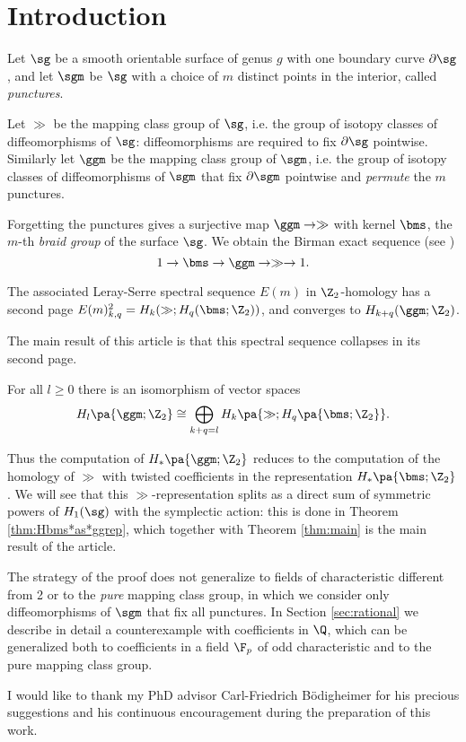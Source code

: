 \section{Introduction}
Let $\sg$ be a smooth orientable surface of genus $g$ with one boundary curve $\partial\sg$, and let $\sgm$ be $\sg$ with
a choice of $m$ distinct points in the interior, called \emph{punctures}.

Let $\gg$ be the mapping class group of $\sg$, i.e. the group of isotopy classes of diffeomorphisms of $\sg$:
diffeomorphisms are required to fix $\partial\sg$ pointwise. Similarly let $\ggm$ be the mapping class group of $\sgm$, i.e.
the group of isotopy classes of diffeomorphisms of $\sgm$ that fix $\partial\sgm$ pointwise and \emph{permute} the $m$ punctures.

Forgetting the punctures gives a surjective map $\ggm\to\gg$ with kernel $\bms$,
the $m$-th \emph{braid group} of the surface $\sg$. We obtain the Birman exact sequence (see \cite{Birman:mcgbr})
\begin{equation}
\label{eq:Birman}
1\to\bms\to\ggm\to\gg\to 1.
\end{equation}

The associated Leray-Serre spectral sequence $E(m)$ in $\Z_2$-homology has a second page $E(m)^2_{k,q}=H_k(\gg;H_q(\bms;\Z_2))$,
and converges to $H_{k+q}(\ggm;\Z_2)$.

The main result of this article is that this spectral sequence collapses in its second page.
\begin{thm}
\label{thm:main}
For all $l\geq 0$ there is an isomorphism of vector spaces
\begin{equation}
\label{eq:main}
H_l\pa{\ggm;\Z_2}\cong \bigoplus_{k+q=l} H_k\pa{\gg;H_q\pa{\bms;\Z_2}}.
\end{equation}
\end{thm}
Thus the computation of $H_*\pa{\ggm;\Z_2}$ reduces to the computation of the homology of $\gg$ with
twisted coefficients in the representation $H_*\pa{\bms;\Z_2}$. We will see that this $\gg$-representation
splits as a direct sum of symmetric powers of $H_1(\sg)$ with the symplectic action: this is done in
Theorem \ref{thm:Hbms*as*ggrep}, which together with Theorem \ref{thm:main} is the main result of the article.

The strategy of the proof does not generalize to fields of characteristic different from 2 or to the \emph{pure}
mapping class group, in which we consider only diffeomorphisms of $\sgm$ that fix all punctures. In Section \ref{sec:rational}
we describe in detail a counterexample with coefficients in $\Q$, which can be generalized both to coefficients
in a field $\F_p$ of odd characteristic and to the pure mapping class group.

I would like to thank my PhD advisor Carl-Friedrich B\"odigheimer for his precious suggestions and his continuous encouragement
during the preparation of this work.